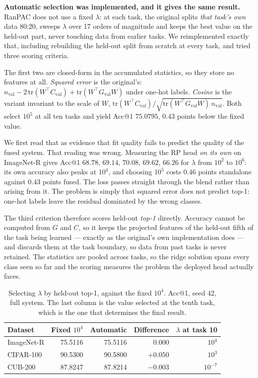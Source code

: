 \documentclass[11pt,a4paper]{article}
\begin{document}
\textbf{Automatic selection was implemented, and it gives the same result.}
RanPAC does not use a fixed $\lambda$: at each task, the original splits
\emph{that task's own} data 80:20, sweeps $\lambda$ over 17 orders of magnitude
and keeps the best value on the held-out part, never touching data from earlier
tasks. We reimplemented exactly that, including rebuilding the held-out split
from scratch at every task, and tried three scoring criteria.

The first two are closed-form in the accumulated statistics, so they store no
features at all. \emph{Squared error} is the original's:
$n_{\mathrm{val}} - 2\,\mathrm{tr}(W^{\top} C_{\mathrm{val}})
+ \mathrm{tr}(W^{\top} G_{\mathrm{val}} W)$ under one-hot labels.
\emph{Cosine} is the variant invariant to the scale of $W$,
$\mathrm{tr}(W^{\top} C_{\mathrm{val}}) /
\sqrt{\mathrm{tr}(W^{\top} G_{\mathrm{val}} W)\, n_{\mathrm{val}}}$. Both select
$10^5$ at all ten tasks and yield Acc@1 $75.0795$, $0.43$ points below the fixed
value.

We first read that as evidence that fit quality fails to predict the quality of
the fused system. That reading was wrong. Measuring the RP head \emph{on its
own} on ImageNet-R gives Acc@1 $68.78$, $69.14$, $70.08$, $69.62$, $66.26$ for
$\lambda$ from $10^2$ to $10^6$: its own accuracy also peaks at $10^4$, and
choosing $10^5$ costs $0.46$ points standalone against $0.43$ points fused. The
loss passes straight through the blend rather than arising from it. The problem
is simply that squared error does not predict top-1: one-hot labels leave the
residual dominated by the wrong classes.

The third criterion therefore scores held-out \emph{top-1} directly. Accuracy
cannot be computed from $G$ and $C$, so it keeps the projected features of the
held-out fifth of the task being learned --- exactly as the original's own
implementation does --- and discards them at the task boundary, so data from
past tasks is never retained. The statistics are pooled across tasks, so the
ridge solution spans every class seen so far and the scoring measures the
problem the deployed head actually faces.

\begin{table}[htbp]
\centering
\caption{Selecting $\lambda$ by held-out top-1, against the fixed $10^4$. Acc@1,
seed 42, full system. The last column is the value selected at the tenth task,
which is the one that determines the final result.}
\label{tab:lambda-auto}
\begin{tabular}{@{}lrrrr@{}}
\toprule
Dataset & Fixed $10^4$ & Automatic & Difference & $\lambda$ at task 10 \\
\midrule
ImageNet-R & 75.5116 & 75.5116 & $0.000$  & $10^4$ \\
CIFAR-100  & 90.5300 & 90.5800 & $+0.050$ & $10^3$ \\
CUB-200    & 87.8247 & 87.8214 & $-0.003$ & $10^{-7}$ \\
\bottomrule
\end{tabular}
\end{table}
\end{document}
